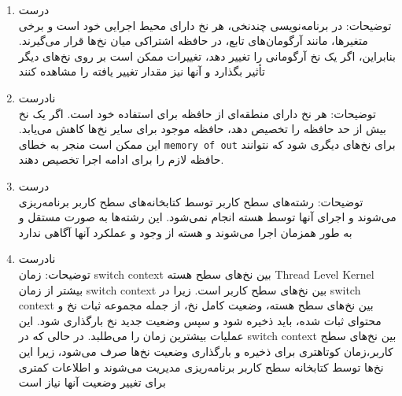 \begin{qsolve}
	\begin{enumerate}
		\item درست\\توضیحات: در برنامه‌نویسی چندنخی، هر نخ دارای محیط اجرایی خود است و برخی متغیرها، مانند آرگومان‌های تابع، در حافظه اشتراکی میان نخ‌ها قرار می‌گیرند. بنابراین، اگر یک نخ آرگومانی را تغییر دهد، تغییرات ممکن است بر روی نخ‌های دیگر تأثیر بگذارد و آنها نیز مقدار تغییر یافته را مشاهده کنند
		
		
		\item نادرست\\ توضیحات: هر نخ دارای منطقه‌ای از حافظه برای استفاده خود است. اگر یک نخ بیش از حد حافظه را تخصیص دهد، حافظه موجود برای سایر نخ‌ها کاهش می‌یابد. این ممکن است منجر به خطای \texttt{memory of out} برای نخ‌های دیگری شود که نتوانند حافظه لازم را برای ادامه اجرا تخصیص دهند.
		
		
		\item درست\\ توضیحات: رشته‌های سطح کاربر توسط کتابخانه‌های سطح کاربر برنامه‌ریزی می‌شوند و اجرای آنها توسط هسته انجام نمی‌شود. این رشته‌ها به صورت مستقل و به طور همزمان اجرا می‌شوند و هسته از وجود و عملکرد آنها آگاهی ندارد
		
		
		\item نادرست\\ توضیحات:‌ زمان switch context بین نخ‌های سطح هسته Thread Level Kernel بیشتر از زمان switch context بین نخ‌های سطح کاربر است. زیرا در switch context بین نخ‌های سطح هسته، وضعیت کامل نخ، از جمله مجموعه ثبات نخ و محتوای ثبات شده، باید ذخیره شود و سپس وضعیت جدید نخ بارگذاری شود. این عملیات بیشترین زمان را می‌طلبد. در حالی که در switch context بین نخ‌های سطح کاربر،زمان کوتاهتری برای ذخیره و بارگذاری وضعیت نخ‌ها صرف می‌شود، زیرا این نخ‌ها توسط کتابخانه سطح کاربر برنامه‌ریزی مدیریت می‌شوند و اطلاعات کمتری برای تغییر وضعیت آنها نیاز است
		
	\end{enumerate}
\end{qsolve}

